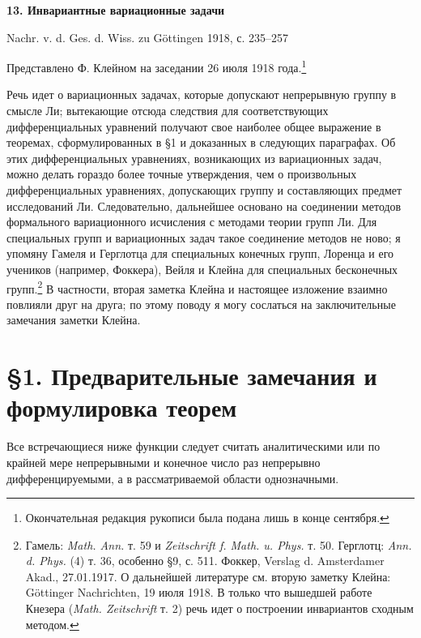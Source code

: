 \documentclass[11pt]{article}
\begin{document}

\begin{center}
{\Large\bfseries 13. Инвариантные вариационные задачи}\par
\vspace{1.5em}
Nachr. v. d. Ges. d. Wiss. zu Göttingen 1918, с. 235--257
\end{center}

\vspace{3em}
\begin{center}
Представлено Ф. Клейном на заседании 26 июля 1918 года.\footnote{Окончательная редакция рукописи была подана лишь в конце сентября.}
\end{center}

Речь идет о вариационных задачах, которые допускают непрерывную группу в смысле Ли; вытекающие отсюда следствия для соответствующих дифференциальных уравнений получают свое наиболее общее выражение в теоремах, сформулированных в \S{}1 и доказанных в следующих параграфах. Об этих дифференциальных уравнениях, возникающих из вариационных задач, можно делать гораздо более точные утверждения, чем о произвольных дифференциальных уравнениях, допускающих группу и составляющих предмет исследований Ли. Следовательно, дальнейшее основано на соединении методов формального вариационного исчисления с методами теории групп Ли. Для специальных групп и вариационных задач такое соединение методов не ново; я упомяну Гамеля и Герглотца для специальных конечных групп, Лоренца и его учеников (например, Фоккера), Вейля и Клейна для специальных бесконечных групп.\footnote{Гамель: \emph{Math. Ann.} т. 59 и \emph{Zeitschrift f. Math. u. Phys.} т. 50. Герглотц: \emph{Ann. d. Phys.} (4) т. 36, особенно \S{}9, с. 511. Фоккер, Verslag d. Amsterdamer Akad., 27.01.1917. О дальнейшей литературе см. вторую заметку Клейна: Göttinger Nachrichten, 19 июля 1918. В только что вышедшей работе Кнезера (\emph{Math. Zeitschrift} т. 2) речь идет о построении инвариантов сходным методом.} В частности, вторая заметка Клейна и настоящее изложение взаимно повлияли друг на друга; по этому поводу я могу сослаться на заключительные замечания заметки Клейна.

\section*{\S{}1. Предварительные замечания и формулировка теорем}

Все встречающиеся ниже функции следует считать аналитическими или по крайней мере непрерывными и конечное число раз непрерывно дифференцируемыми, а в рассматриваемой области однозначными.
\end{document}
